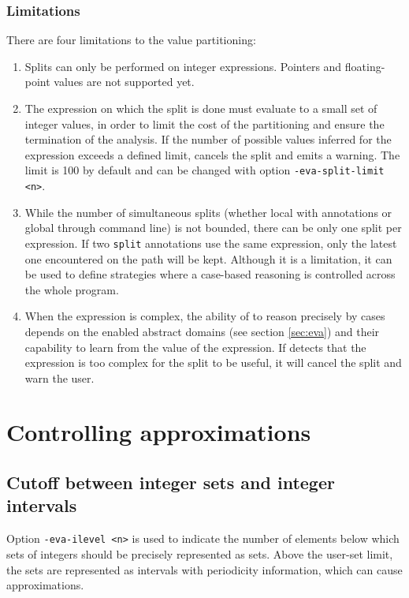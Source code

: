 \documentclass{frama-c-book}
\begin{document}
\subsubsection{Limitations}

There are four limitations to the value partitioning:

\begin{enumerate}
\item Splits can only be performed on integer expressions. Pointers and
  floating-point values are not supported yet.
\item The expression on which the split is done must evaluate to a small set of
  integer values, in order to limit the cost of the partitioning and ensure the
  termination of the analysis. If the number of possible values inferred for the
  expression exceeds a defined limit, \Eva{} cancels the split and emits a
  warning. The limit is 100 by default and can be changed with option
  \lstinline|-eva-split-limit <n>|.
\item While the number of simultaneous splits (whether local with annotations
  or global through command line) is not bounded, there can be only one split
  per expression. If two \lstinline|split| annotations use the same expression,
  only the latest one encountered on the path will be kept. Although it is a
  limitation, it can be used to define strategies where a case-based reasoning
  is controlled across the whole program.
\item When the expression is complex, the ability of \Eva{} to reason
  precisely by cases depends on the enabled abstract domains (see section
  \ref{sec:eva}) and their capability to learn from the value of the expression.
  If \Eva{} detects that the expression is too complex for the split to be useful,
  it will cancel the split and warn the user.
\end{enumerate}


\section{Controlling approximations}
\label{controlling-approximations}

\subsection{Cutoff between integer sets and integer intervals}

Option \verb|-eva-ilevel <n>| is used to indicate the number of elements
below which sets of integers should be precisely represented as sets.
Above the user-set limit, the sets are represented as intervals
with periodicity information, which can cause approximations.
\end{document}

